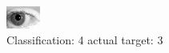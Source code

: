 \begin{figure}[h!]
\begin{center}
\includegraphics[width=0.60\columnwidth]{figures/ID196_class_4_target_3.png}
\end{center}
\caption{ Classification: 4 actual target: 3}
\label{fig:ID196_class_4_target_3}
\end{figure}
